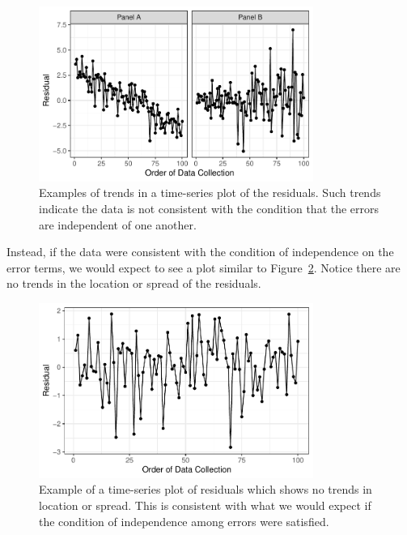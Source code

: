 \documentclass[
  letterpaper,
  DIV=11,
  numbers=noendperiod]{scrreprt}
\theoremstyle{plain}
\theoremstyle{definition}
\theoremstyle{definition}
\theoremstyle{remark}
\begin{document}
\begin{figure}

{\centering \includegraphics[width=0.8\textwidth,height=\textheight]{./images/fig-regassessment-independence-violations-1.pdf}

}

\caption{\label{fig-regassessment-independence-violations}Examples of
trends in a time-series plot of the residuals. Such trends indicate the
data is not consistent with the condition that the errors are
independent of one another.}

\end{figure}

Instead, if the data were consistent with the condition of independence
on the error terms, we would expect to see a plot similar to
Figure~\ref{fig-regassessment-independence-reasonable}. Notice there are
no trends in the location or spread of the residuals.

\begin{figure}

{\centering \includegraphics[width=0.8\textwidth,height=\textheight]{./images/fig-regassessment-independence-reasonable-1.pdf}

}

\caption{\label{fig-regassessment-independence-reasonable}Example of a
time-series plot of residuals which shows no trends in location or
spread. This is consistent with what we would expect if the condition of
independence among errors were satisfied.}

\end{figure}
\end{document}
